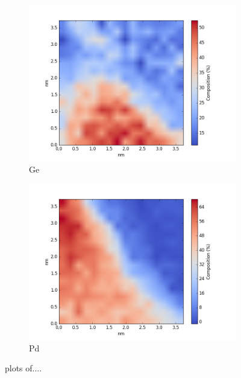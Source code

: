 \begin{figure}
\begin{subfigure}{0.45\textwidth}
		\includegraphics[width=\textwidth]{fig/q/D_heated/_binned_Ge_zetaAbs}
		\caption{Ge}
		\label{fig:Dge}
	\end{subfigure}%
	\hfill
	\begin{subfigure}{0.45\textwidth}
		\includegraphics[width=\textwidth]{fig/q/D_heated/_binned_Pd_zetaAbs}
		\caption{Pd}
		\label{fig:Dpd}
	\end{subfigure}
	\caption{plots of....}
	\label{fig:D}
\end{figure}

